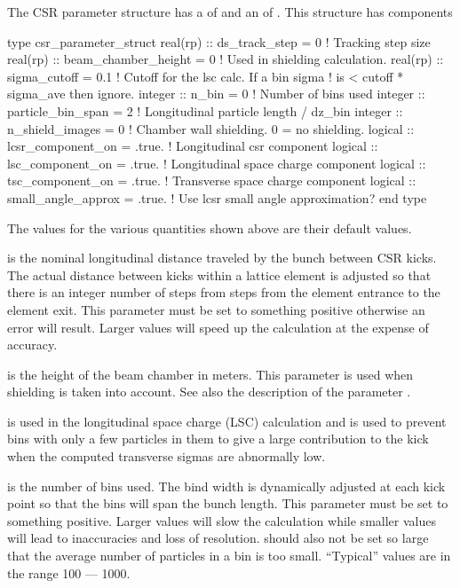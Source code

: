 {{{{{{{The CSR parameter structure has a 
of  and an  of .
This structure has components
\begin{example}
  type csr_parameter_struct 
    real(rp) :: ds_track_step = 0          ! Tracking step size
    real(rp) :: beam_chamber_height = 0    ! Used in shielding calculation.
    real(rp) :: sigma_cutoff = 0.1         ! Cutoff for the lsc calc. If a bin sigma
                                           !  is < cutoff * sigma_ave then ignore.
    integer :: n_bin = 0                   ! Number of bins used
    integer :: particle_bin_span = 2       ! Longitudinal particle length / dz_bin
    integer :: n_shield_images = 0         ! Chamber wall shielding. 0 = no shielding.
    logical :: lcsr_component_on = .true.  ! Longitudinal csr component
    logical :: lsc_component_on = .true.   ! Longitudinal space charge component
    logical :: tsc_component_on = .true.   ! Transverse space charge component
    logical :: small_angle_approx = .true. ! Use lcsr small angle approximation?
  end type
\end{example}
The values for the various quantities shown above are their default values. 

 is the nominal longitudinal distance traveled by
the bunch between CSR kicks. The actual distance between kicks within
a lattice element is adjusted so that there is an integer number of
steps from steps from the element entrance to the element exit.  This
parameter must be set to something positive otherwise an error will
result. Larger values will speed up the calculation at the expense of
accuracy.

 is the height of the beam chamber in
meters. This parameter is used when shielding is taken into account.
See also the description of the parameter .

 is used in the longitudinal space charge (LSC)
calculation and is used to prevent bins with only a few particles in
them to give a large contribution to the kick when the computed
transverse sigmas are abnormally low.

 is the number of bins used. The bind width is dynamically
adjusted at each kick point so that the bins will span the bunch
length.  This parameter must be set to something positive. Larger
values will slow the calculation while smaller values will lead to
inaccuracies and loss of resolution.  should also not be set
so large that the average number of particles in a bin is too small. 
``Typical'' values are in the range 100 --- 1000.

}}}}}}}

